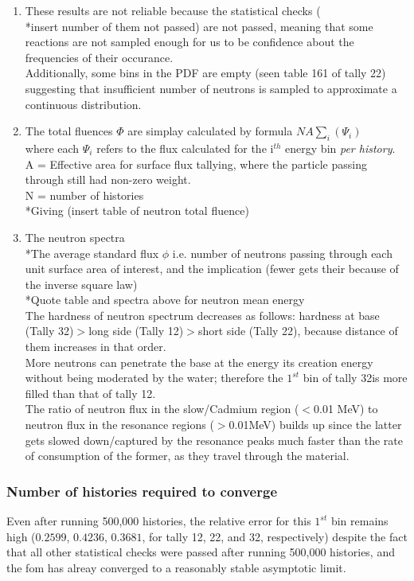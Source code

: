 \documentclass[a4paper, 12pt]{article}
\begin{document}
\begin{enumerate}
	\item These results are not reliable because the statistical checks (\\*insert number of them not passed) are not passed, meaning that some reactions are not sampled enough for us to be confidence about the frequencies of their occurance.
	\\Additionally, some bins in the PDF are empty (seen table 161 of tally 22) suggesting that insufficient number of neutrons is sampled to approximate a continuous distribution.
	\item The total fluences $\Phi$ are simplay calculated by formula $N A \sum_i (\Psi_i)$ 
		\\where each $\Psi_i$ refers to the flux calculated for the i${}^{th}$ energy bin \emph{per history}.
		\\      A = Effective area for surface flux tallying, where the particle passing through still had non-zero weight.
		\\      N = number of histories
		\\*Giving (insert table of neutron total fluence)
	\item The neutron spectra 
	\\*The average standard flux $\phi$ i.e. number of neutrons passing through each unit surface area of interest, and the implication (fewer gets their because of the inverse square law)
	\\*Quote table and spectra above for neutron mean energy
	\\The hardness of neutron spectrum decreases as follows: hardness at base (Tally 32)$>$long side (Tally 12)$>$short side (Tally 22), because distance of them increases in that order.
	\\More neutrons can penetrate the base at the energy its creation energy without being moderated by the water; therefore the $1^{st}$ bin of tally 32is more filled than that of tally 12. 
	\\The ratio of neutron flux in the slow/Cadmium region ($<$0.01 MeV) to neutron flux in the resonance regions ($>$0.01MeV) builds up since the latter gets slowed down/captured by the resonance peaks much faster than the rate of consumption of the former, as they travel through the material.
\end{enumerate}
\subsubsection{Number of histories required to converge} \label{Ex3NumHist}
Even after running 500,000 histories, the relative error for this $1^{st}$ bin remains high ($0.2599$, $0.4236$, $0.3681$, for tally 12, 22, and 32, respectively) despite the fact that all other statistical checks were passed after running 500,000 histories, and the fom has alreay converged to a reasonably stable asymptotic limit.
\end{document}
